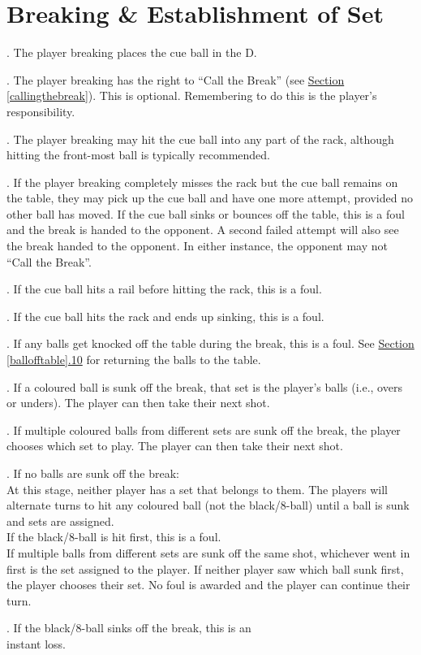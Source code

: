 \documentclass[a4paper, twocolumn]{article}
\newcommand{\fixedlabel}[1]{\textbf{\makebox[3.5em][l]{#1}}}
\newcommand{\itemspace}{\vspace{1.2mm}\\}
\begin{document}
\section{Breaking \& Establishment of Set} \label{breaking}
\ex. The player breaking places the cue ball in the D.\par
\ex. The player breaking has the right to “Call the Break” (see \hyperref[callingthebreak]{Section \ref*{callingthebreak}}). This is optional. Remembering to do this is the player's responsibility.\par
\ex. \label{breakingballs}The player breaking may hit the cue ball into any part of the rack, although hitting the front-most ball is typically recommended.\par
\ex. If the player breaking completely misses the rack but the cue ball remains on the table, they may pick up the cue ball and have one more attempt, provided no other ball has moved. If the cue ball sinks or bounces off the table, this is a foul and the break is handed to the opponent. A second failed attempt will also see the break handed to the opponent. In either instance, the opponent may not “Call the Break”.\par
\ex. If the cue ball hits a rail before hitting the rack, this is a foul.\par
\ex. If the cue ball hits the rack and ends up sinking, this is a foul.\par
\ex. If any balls get knocked off the table during the break, this is a foul. See \hyperref[ballofftable]{Section \ref*{ballofftable}.10} for returning the balls to the table.\par
\ex. If a coloured ball is sunk off the break, that set is the player's balls (i.e., overs or unders). The player can then take their next shot.\par
\ex. If multiple coloured balls from different sets are sunk off the break, the player chooses which set to play. The player can then take their next shot.\par
\ex. \label{breakingnoballs}If no balls are sunk off the break:\itemspace
\fixedlabel{3.10.1}At this stage, neither player has a set that belongs to them. The players will alternate turns to hit any coloured ball (not the black/8-ball) until a ball is sunk and sets are assigned.\itemspace
\fixedlabel{3.10.2}If the black/8-ball is hit first, this is a foul.\itemspace
\fixedlabel{3.10.3}If multiple balls from different sets are sunk off the same shot, whichever went in first is the set assigned to the player. If neither player saw which ball sunk first, the player chooses their set. No foul is awarded and the player can continue their turn.
\par
\ex. \hspace{-2.6mm} If the black/8-ball sinks off the break, this is an \\ \phantom{} \hspace{-2.5mm}instant loss.\par
\end{document}
